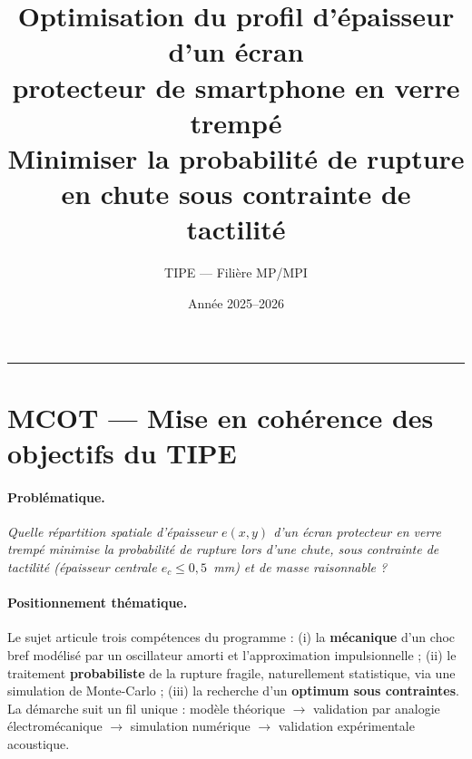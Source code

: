 \documentclass[11pt,a4paper]{article}
\title{\vspace{-1cm}\textbf{Optimisation du profil d'épaisseur d'un écran\\
protecteur de smartphone en verre trempé}\\[4pt]
\large Minimiser la probabilité de rupture en chute sous contrainte de tactilité}
\author{TIPE --- Filière MP/MPI}
\date{Année 2025--2026}
\begin{document}
\maketitle
\thispagestyle{empty}

\begin{center}
\end{center}

\tableofcontents
\bigskip
\hrule


\section{MCOT --- Mise en cohérence des objectifs du TIPE}

\paragraph{Problématique.}
\emph{Quelle répartition spatiale d'épaisseur $e(x,y)$ d'un écran protecteur
en verre trempé minimise la probabilité de rupture lors d'une chute, sous
contrainte de tactilité (épaisseur centrale $e_c \le 0{,}5$~mm) et de masse
raisonnable ?}

\paragraph{Positionnement thématique.}
Le sujet articule trois compétences du programme : (i) la \textbf{mécanique}
d'un choc bref modélisé par un oscillateur amorti et l'approximation
impulsionnelle ; (ii) le traitement \textbf{probabiliste} de la rupture
fragile, naturellement statistique, via une simulation de Monte-Carlo ; (iii)
la recherche d'un \textbf{optimum sous contraintes}. La démarche suit un fil
unique : modèle théorique $\rightarrow$ validation par analogie
électromécanique $\rightarrow$ simulation numérique $\rightarrow$ validation
expérimentale acoustique.
\end{document}
